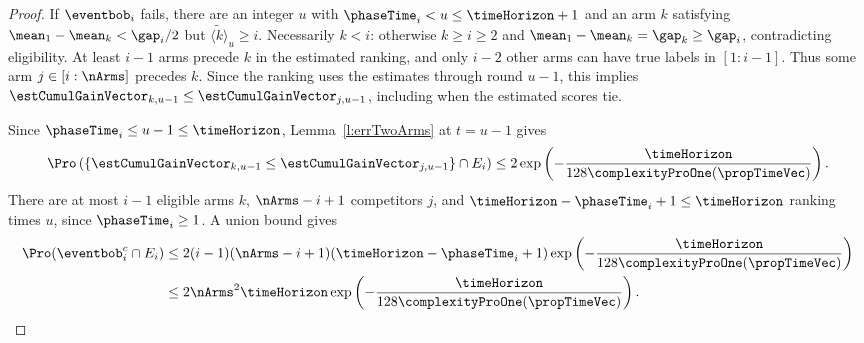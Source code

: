 \begin{proof}
If $\eventbob_i$ fails, there are an integer $u$ with
$\phaseTime_i<u\leq\timeHorizon+1$ and an arm $k$ satisfying
$\mean_1-\mean_k<\gap_i/2$ but $\tilde{\langle k\rangle}_u\geq i$.
Necessarily $k<i$: otherwise $k\geq i\geq2$ and
$\mean_1-\mean_k=\gap_k\geq\gap_i$, contradicting eligibility.
At least $i-1$ arms precede $k$ in the estimated ranking, and
only $i-2$ other arms can have true labels in $[1:i-1]$.
Thus some arm $j\in[i:\nArms]$ precedes $k$. Since the ranking
uses the estimates through round $u-1$, this implies
$\estCumulGainVector_{k,u-1}\leq\estCumulGainVector_{j,u-1}$,
including when the estimated scores tie.

Since $\phaseTime_i\leq u-1\leq\timeHorizon$,
Lemma~\ref{l:errTwoArms} at $t=u-1$ gives
\[
\Pro\left(
\{\estCumulGainVector_{k,u-1}\leq\estCumulGainVector_{j,u-1}\}
\cap E_i\right)
\leq2\exp\left(-\frac{\timeHorizon}
{128\complexityProOne(\propTimeVec)}\right).
\]
There are at most $i-1$ eligible arms $k$, $\nArms-i+1$
competitors $j$, and $\timeHorizon-\phaseTime_i+1\leq\timeHorizon$
ranking times $u$, since $\phaseTime_i\geq1$.
A union bound gives
\begin{align*}
\Pro(\eventbob_i^c\cap E_i)
&\leq2(i-1)(\nArms-i+1)(\timeHorizon-\phaseTime_i+1)
\exp\left(-\frac{\timeHorizon}
{128\complexityProOne(\propTimeVec)}\right)\\
&\leq2\nArms^2\timeHorizon
\exp\left(-\frac{\timeHorizon}
{128\complexityProOne(\propTimeVec)}\right).
\end{align*}
\end{proof}%
%
	\setcounter{scratchcounter}{\value{theorem}}
\lightres*
\setcounter{theorem}{\the\numexpr\value{scratchcounter}}
